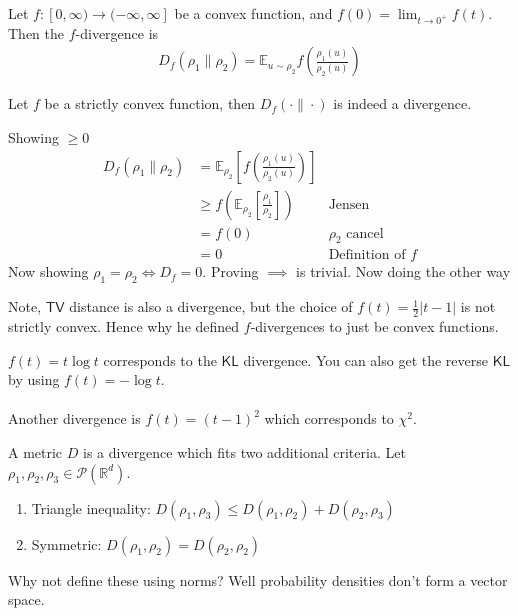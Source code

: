 \documentclass[11pt,fleqn]{article}
\numberwithin{equation}{section}
\theoremstyle{definition}
\theoremstyle{definition}
\renewenvironment{proof}[1][\proofname]{\vspace{-10pt}\begin{replacementproof}}{\end{replacementproof}}
\begin{document}
\begin{definition}
	Let $f: [0, \infty) \to (-\infty, \infty]$ be a convex function, and $f(0) = \lim_{t \to 0^+} f(t)$. Then the $f$-divergence is 
	\begin{align}
		D_f(\rho_1 \| \rho_2) = \mathbb E_{u \sim \rho_2} f \left( \frac{\rho_1(u)}{\rho_2(u)} \right)
	\end{align}
\end{definition}
\begin{theorem}
	Let $f$ be a strictly convex function, then $D_f(\cdot \| \cdot)$ is indeed a divergence.
\end{theorem}
\begin{proof}
	Showing $\geq 0$
	\begin{align}
		D_f(\rho_1 \| \rho_2) & = \mathbb E_{\rho_2} \left[ f \left( \frac{\rho_1(u)}{\rho_2(u)} \right) \right]\\ 
		& \geq f \left( \mathbb E_{\rho_2} \left[ \frac{\rho_1}{\rho_2} \right] \right) & \text{Jensen}\\
		& = f(0) & \rho_2 \text{ cancel} \\
		& = 0 & \text{Definition of } f
	\end{align}
	Now showing $\rho_1 = \rho_2 \iff D_f = 0$. Proving $\implies$ is trivial. Now doing the other way
\end{proof}
Note, $\textsf{TV}$ distance is also a divergence, but the choice of $f(t) = \frac{1}{2} | t-  1|$ is not strictly convex. Hence why he defined $f$-divergences to just be convex functions.

\begin{eg}
	$f(t) = t \log t$ corresponds to the $\textsf{KL}$ divergence. You can also get the reverse $\textsf{KL}$ by using $f(t) = - \log t$. \\
	\\
	Another divergence is $f(t) = (t-1)^2$ which corresponds to $\chi^2$.
\end{eg}

\begin{definition}
	[Metric] A metric $D$ is a divergence which fits two additional criteria. Let $\rho_1, \rho_2, \rho_3 \in \mathcal P(\mathbb R^d)$.
	\begin{enumerate}
		\item Triangle inequality: $D(\rho_1, \rho_3) \leq  D(\rho_1 , \rho_2) + D(\rho_2, \rho_3)$
		\item Symmetric: $D(\rho_1, \rho_2) = D(\rho_2, \rho_2)$
	\end{enumerate}
\end{definition}
Why not define these using norms? Well probability densities don't form a vector space.
\end{document}
